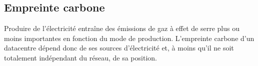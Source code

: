 \documentclass[a4paper,10pt]{article}
\begin{document}
\begin{comment}


\begin{table}[]
    \caption{Un exemple de sortie CSV d'Alumet}
    \label{tab:my-table}
    \resizebox{\textwidth}{!}{%
    \begin{tabular}{@{}llllllll@{}}
    \toprule
    metric                    & timestamp                      & value            & resource\_kind & resource\_id & consumer\_kind & consumer\_id & domain   \\ \midrule
    rapl\_consumed\_energy\_J & 2024-10-02T13:53:52.988727804Z & 1.8477783203125  & cpu\_package   & 0            & local\_machine &              & pp0      \\
    rapl\_consumed\_energy\_J & 2024-10-02T13:53:52.988727804Z & 3.38043212890625 & local\_machine &              & local\_machine &              & platform \\
    rapl\_consumed\_energy\_J & 2024-10-02T13:53:52.988727804Z & 2.18017578125    & cpu\_package   & 0            & local\_machine &              & package  \\ \bottomrule
    \end{tabular}%
    }
    \end{table}
\end{comment}

\subsection{Empreinte carbone}

Produire de l'électricité entraîne des émissions de gaz à effet de serre plus ou
moins importantes en fonction du mode de production. L'empreinte carbone d'un
datacentre dépend donc de ses sources d'électricité et, à moins qu'il ne soit
totalement indépendant du réseau, de sa position.
\end{document}
